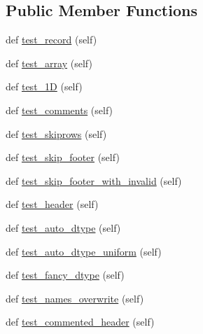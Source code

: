 \subsection*{Public Member Functions}
\begin{DoxyCompactItemize}
\item 
def \hyperlink{classnumpy_1_1lib_1_1tests_1_1test__io_1_1TestFromTxt_a5f70659ad1123565e5340129b9852aae}{test\+\_\+record} (self)
\item 
def \hyperlink{classnumpy_1_1lib_1_1tests_1_1test__io_1_1TestFromTxt_a10b94d23b66ca34ab6c396f27ef91d51}{test\+\_\+array} (self)
\item 
def \hyperlink{classnumpy_1_1lib_1_1tests_1_1test__io_1_1TestFromTxt_a9a766aaa3e282026829beb9aa897a0d2}{test\+\_\+1D} (self)
\item 
def \hyperlink{classnumpy_1_1lib_1_1tests_1_1test__io_1_1TestFromTxt_ad7340dea98f256895bbbf2ac11f1d233}{test\+\_\+comments} (self)
\item 
def \hyperlink{classnumpy_1_1lib_1_1tests_1_1test__io_1_1TestFromTxt_a6fc3ef8af64bc8e2299410e0efc6ae5a}{test\+\_\+skiprows} (self)
\item 
def \hyperlink{classnumpy_1_1lib_1_1tests_1_1test__io_1_1TestFromTxt_a3f7671443a628e9128f614ba03c2c568}{test\+\_\+skip\+\_\+footer} (self)
\item 
def \hyperlink{classnumpy_1_1lib_1_1tests_1_1test__io_1_1TestFromTxt_a5558fa022ea6fefff6196a8a2eebf7ca}{test\+\_\+skip\+\_\+footer\+\_\+with\+\_\+invalid} (self)
\item 
def \hyperlink{classnumpy_1_1lib_1_1tests_1_1test__io_1_1TestFromTxt_a9d8ce113ad43306be98b936beb6e0664}{test\+\_\+header} (self)
\item 
def \hyperlink{classnumpy_1_1lib_1_1tests_1_1test__io_1_1TestFromTxt_a5389ead033d9f6329c259b6a73d4cbd9}{test\+\_\+auto\+\_\+dtype} (self)
\item 
def \hyperlink{classnumpy_1_1lib_1_1tests_1_1test__io_1_1TestFromTxt_a3fa743440ee76b20f16a778934060aac}{test\+\_\+auto\+\_\+dtype\+\_\+uniform} (self)
\item 
def \hyperlink{classnumpy_1_1lib_1_1tests_1_1test__io_1_1TestFromTxt_accc03468062c51ab54d9f6fa2ca39c20}{test\+\_\+fancy\+\_\+dtype} (self)
\item 
def \hyperlink{classnumpy_1_1lib_1_1tests_1_1test__io_1_1TestFromTxt_a452c96a7cc602bc104544253204c4918}{test\+\_\+names\+\_\+overwrite} (self)
\item 
def \hyperlink{classnumpy_1_1lib_1_1tests_1_1test__io_1_1TestFromTxt_a2bfd61bd3956f4d4edfbdba370f03e9f}{test\+\_\+commented\+\_\+header} (self)

\end{DoxyCompactItemize}
